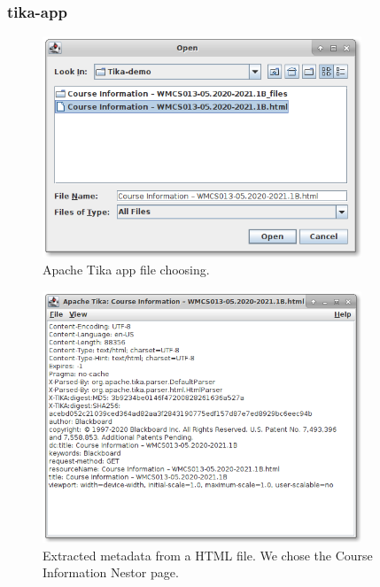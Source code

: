 \documentclass{article}
\begin{document}
\subsubsection{tika-app}
\begin{figure}
    \centering
    \includegraphics[width=0.85\textwidth]{report/images/tika_app/filechooser.png}
    \caption{Apache Tika app file choosing.}
    \label{fig:tika_app/filechooser}
\end{figure}
\begin{figure}
    \centering
    \includegraphics[width=0.85\textwidth]{report/images/tika_app/metadata.png}
    \caption{Extracted metadata from a HTML file. We chose the Course Information Nestor page.}
    \label{fig:tika_app/metadata}
\end{figure}
\end{document}
